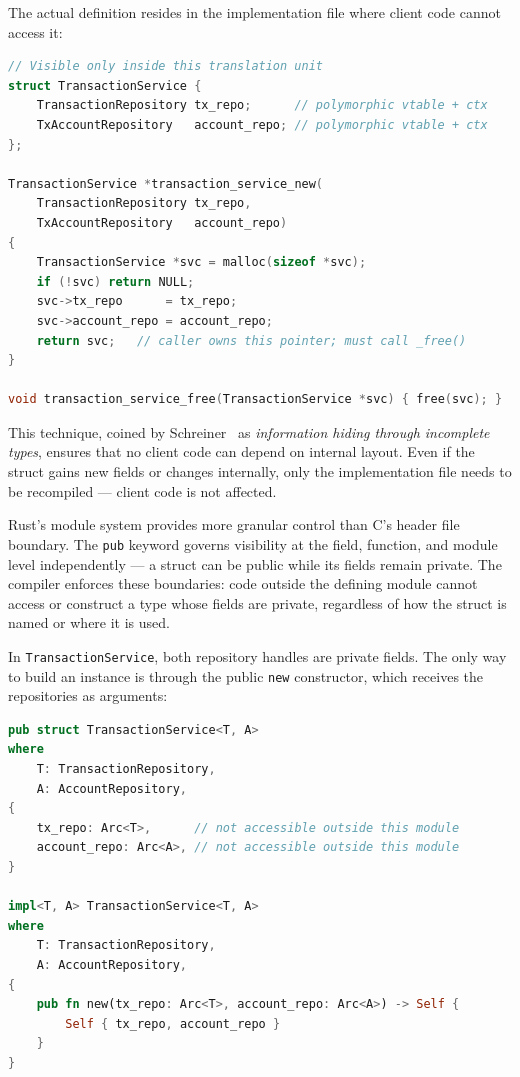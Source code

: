 The actual definition resides in the implementation file where client code cannot
access it:

\begin{lstlisting}[language=C, caption={transaction\_service.c --- The concrete
struct is defined only in the implementation file. Client code cannot read or
modify \texttt{tx\_repo} and \texttt{account\_repo} directly; all access goes
through the public functions declared in the header.}]
// Visible only inside this translation unit
struct TransactionService {
    TransactionRepository tx_repo;      // polymorphic vtable + ctx
    TxAccountRepository   account_repo; // polymorphic vtable + ctx
};

TransactionService *transaction_service_new(
    TransactionRepository tx_repo,
    TxAccountRepository   account_repo)
{
    TransactionService *svc = malloc(sizeof *svc);
    if (!svc) return NULL;
    svc->tx_repo      = tx_repo;
    svc->account_repo = account_repo;
    return svc;   // caller owns this pointer; must call _free()
}

void transaction_service_free(TransactionService *svc) { free(svc); }
\end{lstlisting}

This technique, coined by Schreiner~\cite{Schreiner1993} as \emph{information hiding
through incomplete types}, ensures that no client code can depend on internal layout.
Even if the struct gains new fields or changes internally, only the implementation 
file needs to be recompiled --- client code is not affected.

Rust's module system provides more granular control than C's header file
boundary. The \texttt{pub} keyword governs visibility at the field, function,
and module level independently --- a struct can be public while its fields
remain private. The compiler enforces these boundaries: code outside the
defining module cannot access or construct a type whose fields are private,
regardless of how the struct is named or where it is used.

In \texttt{TransactionService}, both repository handles are private fields.
The only way to build an instance is through the public \texttt{new}
constructor, which receives the repositories as arguments:

\begin{lstlisting}[language=Rust, caption={transaction.rs (service) --- Fields
are private by default. Outside this module, the only way to create a
\texttt{TransactionService} is through \texttt{new}.}]
pub struct TransactionService<T, A>
where
    T: TransactionRepository,
    A: AccountRepository,
{
    tx_repo: Arc<T>,      // not accessible outside this module
    account_repo: Arc<A>, // not accessible outside this module
}

impl<T, A> TransactionService<T, A>
where
    T: TransactionRepository,
    A: AccountRepository,
{
    pub fn new(tx_repo: Arc<T>, account_repo: Arc<A>) -> Self {
        Self { tx_repo, account_repo }
    }
}
\end{lstlisting}

